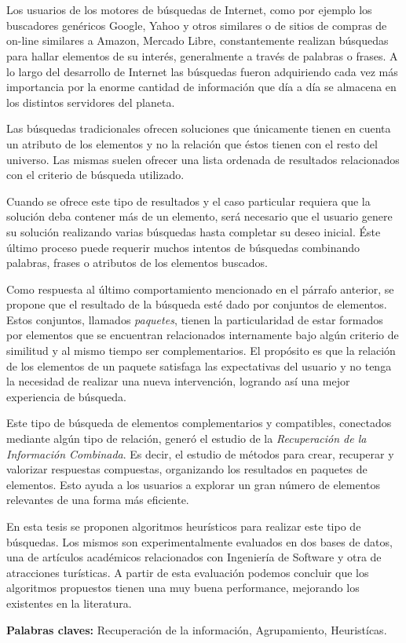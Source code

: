 \chapter*{\runtitulo}

\noindent 

Los usuarios de los motores de búsquedas de Internet, como por ejemplo los buscadores genéricos Google, Yahoo y otros similares o de sitios de compras de on-line similares a Amazon, Mercado Libre, constantemente realizan búsquedas para hallar elementos de su interés, generalmente a través de palabras o frases. A lo largo del desarrollo de Internet las búsquedas fueron adquiriendo cada vez más importancia por la enorme cantidad de información que día a día se almacena en los distintos servidores del planeta.

Las búsquedas tradicionales ofrecen soluciones que únicamente tienen en cuenta un atributo de los elementos y no la relación que éstos tienen con el resto del universo. Las mismas suelen ofrecer una lista ordenada de resultados relacionados con el criterio de búsqueda utilizado. 

Cuando se ofrece este tipo de resultados y el caso particular requiera que la solución deba contener más de un elemento, será necesario que el usuario genere su solución realizando varias búsquedas hasta completar su deseo inicial. Éste último proceso puede requerir muchos intentos de búsquedas combinando palabras, frases o atributos de los elementos buscados.

Como respuesta al último comportamiento mencionado en el párrafo anterior, se propone que el resultado de la búsqueda esté dado por conjuntos de elementos. Estos conjuntos, llamados {\em paquetes}, tienen la particularidad de estar formados por elementos que se encuentran relacionados internamente bajo algún criterio de similitud y al mismo tiempo ser complementarios. El propósito es que la relación de los elementos de un paquete satisfaga las expectativas del usuario y no tenga la necesidad de realizar una nueva intervención, logrando así una mejor experiencia de búsqueda.

Este tipo de búsqueda de elementos complementarios y compatibles, conectados mediante algún tipo de relación, generó el estudio de la {\em Recuperación de la Información Combinada}. Es decir, el estudio de métodos para crear, recuperar y valorizar respuestas compuestas, organizando los resultados en paquetes de elementos. Esto ayuda a los usuarios a explorar un gran número de elementos relevantes de una forma más eficiente.

En esta tesis se proponen algoritmos heurísticos para realizar este tipo de búsquedas. Los mismos son experimentalmente evaluados en dos bases de datos, una de artículos académicos relacionados con Ingeniería de Software y otra de atracciones turísticas. A partir de esta evaluación podemos concluir que los algoritmos propuestos tienen una muy buena performance, mejorando los existentes en la literatura.
\bigskip


\noindent\textbf{Palabras claves:} Recuperación de la información, Agrupamiento, Heuristícas.